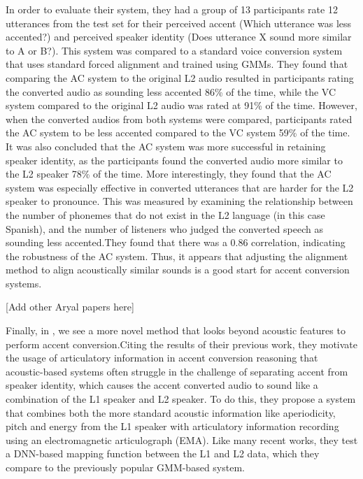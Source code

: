 \documentclass
[
    a4paper,
    twoside,
    12pt
]
{report}
\begin{document}
In order to evaluate their system, they had a group of 13 participants
rate 12 utterances from the test set for their perceived accent (Which
utterance was less accented?) and perceived speaker identity (Does
utterance X sound more similar to A or B?). This system was compared to
a standard voice conversion system that uses standard forced alignment
and trained using GMMs. They found that comparing the AC system to the
original L2 audio resulted in participants rating the converted audio as
sounding less accented 86\% of the time, while the VC system compared to
the original L2 audio was rated at 91\% of the time. However, when the
converted audios from both systems were compared, participants rated the
AC system to be less accented compared to the VC system 59\% of the
time. It was also concluded that the AC system was more successful in
retaining speaker identity, as the participants found the converted
audio more similar to the L2 speaker 78\% of the time. More
interestingly, they found that the AC system was especially effective in
converted utterances that are harder for the L2 speaker to pronounce.
This was measured by examining the relationship between the number of
phonemes that do not exist in the L2 language (in this case Spanish),
and the number of listeners who judged the converted speech as sounding
less accented.They found that there was a 0.86 correlation, indicating
the robustness of the AC system. Thus, it appears that adjusting the
alignment method to align acoustically similar sounds is a good start
for accent conversion systems.

{[}Add other Aryal papers here{]}

Finally, in \textcite{aryal2015}, we see a more novel method that looks
beyond acoustic features to perform accent conversion.Citing the results
of their previous work, they motivate the usage of articulatory
information in accent conversion reasoning that acoustic-based systems
often struggle in the challenge of separating accent from speaker
identity, which causes the accent converted audio to sound like a
combination of the L1 speaker and L2 speaker. To do this, they propose a
system that combines both the more standard acoustic information like
aperiodicity, pitch and energy from the L1 speaker with articulatory
information recording using an electromagnetic articulograph (EMA). Like
many recent works, they test a DNN-based mapping function between the L1
and L2 data, which they compare to the previously popular GMM-based
system.
\end{document}

